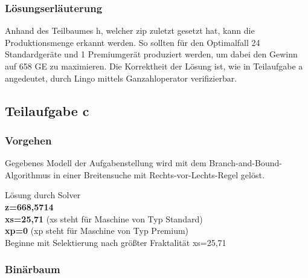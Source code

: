 \documentclass[a4paper,11pt]{article}
\begin{document}
\subsubsection*{Lösungserläuterung}
Anhand des Teilbaumes h, welcher zip zuletzt gesetzt hat, kann die Produktionsmenge erkannt werden. So sollten für den Optimalfall 24 Standardgeräte und 1 Premiumgerät produziert werden, um dabei den Gewinn auf 658 GE zu maximieren. Die Korrektheit der Lösung ist, wie in Teilaufgabe a angedeutet, durch Lingo mittels Ganzahloperator verifizierbar.

\subsection*{Teilaufgabe c}
\subsubsection*{Vorgehen}
Gegebenes Modell der Aufgabenstellung wird mit dem Branch-and-Bound-Algorithmus in einer Breitensuche mit Rechts-vor-Lechts-Regel gelöst.

Lösung durch Solver \\
\textbf{z=668,5714} \\
\textbf{xs=25,71} (xs steht für Maschine von Typ Standard) \\
\textbf{xp=0} (xp steht für Maschine von Typ Premium) \\

Beginne mit Selektierung nach größter Fraktalität xs=25,71

\subsubsection*{Binärbaum}

\end{document}
